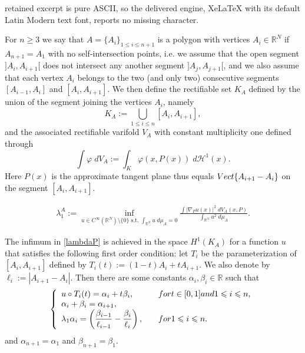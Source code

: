 \documentclass[10pt,a4paper]{amsart}
\newcommand{\R}{\mathbb{R}}
\begin{document}
retained excerpt is pure ASCII, so the delivered engine, XeLaTeX with its default Latin Modern text font, reports no missing character.
\medskip\begin{definition} \label{defPolygon} For $n\geqslant 3$ we say that  $A=\{A_i\}_{1\leqslant i \leqslant n+1}$ is  a polygon with vertices $A_i \in \R^N$ if  $A_{n+1}=A_1$ with no self-intersection points, i.e. we assume that  the open  segment $]A_i,A_{i+1}[$ does not intersect any another segment $]A_j,A_{j+1}[$, and we also assume that each vertex $A_i$ belongs to the two (and only two) consecutive segments $[A_{i-1},A_i]$ and $[A_i,A_{i+1}]$. We then define the rectifiable set $K_A$ defined by the union of the segment joining the vertices $A_i$, namely
 $$K_A:=\bigcup_{1\leqslant i \leqslant n}[A_i , A_{i+1}],$$
and the associated rectifiable varifold $V_A$ with constant multiplicity one  defined through 
 $$\int \varphi \;dV_{A}:=\int_{K} \varphi(x,P(x)) \;d\mathcal{H}^1(x).$$
Here $P(x)$ is the approximate tangent plane thus equals $\textnormal{Vect}\{A_{i+1}-A_{i}\}$ on the segment $[A_i,A_{i+1}]$. 
\end{definition}

 \begin{eqnarray}
 \lambda_1^A:=\inf_{u \in C^\infty(\mathbb{R}^N) \setminus \{0\} \text{ s.t. } \int_{\R^N} u \; d \mu_A=0} \frac{\int |\nabla_P u(x)|^2 \;d V_A(x,P)}{\int_{\mathbb{R}^N} u^2\;d\mu_A}. \label{lambdaP}
 \end{eqnarray}

 \medskip\begin{proposition} \label{firstorder1}  The infimum in \eqref{lambdaP} is achieved  in the space $H^1(K_A)$ for a function $u$ that satisfies the following first order condition: let  $T_i$ be the parameterization of $[A_i,A_{i+1}]$ defined by $T_i(t) := (1-t)A_i + tA_{i+1}$. We also denote by $\ell_i:=|A_{i+1}-A_i|$. Then there are  some constants $\alpha_i,\beta_i \in \R$ such that
$$
\left\{
 \begin{array}{ll}
u\circ T_i(t)=\alpha_i +t \beta_i, \quad  &\textnormal{ for } t\in[0,1] \textnormal{ and }  1\leqslant i \leqslant n,\\
\alpha_i+\beta_i=\alpha_{i+1},\\\displaystyle 
\lambda_1\alpha_i=\left(\frac{\beta_{i-1}}{\ell_{i-1}} - \frac{\beta_i}{\ell_i}\right), \quad &\textnormal{for } 1\leqslant i  \leqslant n.
 \end{array}
  \right. 
 $$
and $\alpha_{n+1}=\alpha_1$ and $\beta_{n+1}=\beta_1$.
 \end{proposition}
\end{document}
